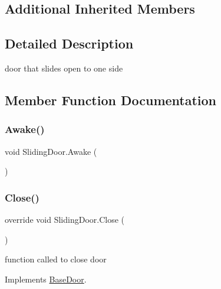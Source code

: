 \subsection*{Additional Inherited Members}


\subsection{Detailed Description}
door that slides open to one side 



\subsection{Member Function Documentation}
\mbox{\label{class_sliding_door_af7235e859e82cdf3dbedc926cf789623}} 
\subsubsection{\texorpdfstring{Awake()}{Awake()}}
{\footnotesize\ttfamily void Sliding\+Door.\+Awake (\begin{DoxyParamCaption}{ }\end{DoxyParamCaption})\hspace{0.3cm}{\ttfamily [private]}}

\mbox{\label{class_sliding_door_a22d2e8580503b045da48510214599746}} 
\subsubsection{\texorpdfstring{Close()}{Close()}}
{\footnotesize\ttfamily override void Sliding\+Door.\+Close (\begin{DoxyParamCaption}{ }\end{DoxyParamCaption})\hspace{0.3cm}{\ttfamily [virtual]}}



function called to close door 



Implements \mbox{\hyperlink{class_base_door_a94151e5cbf90bd3d2b55f339b87916c7}{Base\+Door}}.


